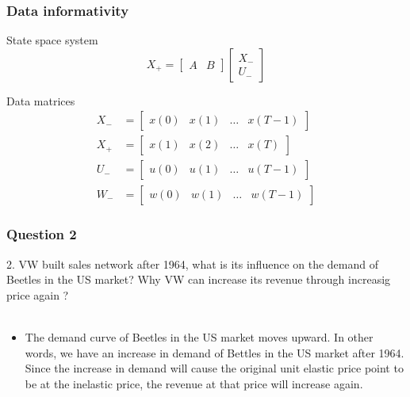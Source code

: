 \documentclass{beamer}
\begin{document}
\begin{frame}
	\frametitle{Data informativity}
	\begin{block}{State space system}
		\[ X_+ = \begin{bmatrix} A & B \end{bmatrix} \begin{bmatrix} X_- \\ U_- \end{bmatrix} \]
	\end{block}

	\begin{block}{Data matrices}
		\begin{align*}
		X_- &= \begin{bmatrix} x(0) & x(1) & \dots & x(T-1) \end{bmatrix} \\
		X_+ &= \begin{bmatrix} x(1) & x(2) & \dots & x(T)   \end{bmatrix} \\
		U_- &= \begin{bmatrix} u(0) & u(1) & \dots & u(T-1) \end{bmatrix} \\
		W_- &= \begin{bmatrix} w(0) & w(1) & \dots & w(T-1) \end{bmatrix} 
		\end{align*}
	\end{block}	
\end{frame}


\begin{frame}
	\frametitle{Question 2}
	
	2. VW built sales network after 1964, what is its influence on the demand of Beetles in the US market? Why VW can increase its revenue through increasig price again ?\\~\\
	
	\begin{itemize}
		\item The demand curve of Beetles in the US market moves upward. In other words, we have an increase in demand of Bettles in the US market after 1964. Since the increase in demand will cause the original unit elastic price point to be at the inelastic price, the revenue at that price will increase again.
	\end{itemize}
\end{frame}
\end{document}
